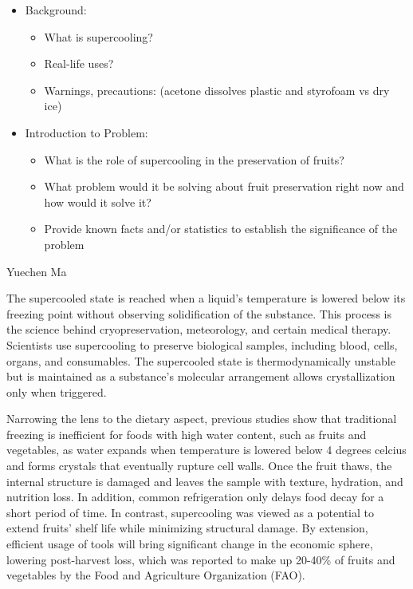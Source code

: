 \begin{itemize}
\item
  Background:

  \begin{itemize}
  \item
    What is supercooling?
  \item
    Real-life uses?
  \item
    Warnings, precautions: (acetone dissolves plastic and styrofoam vs
    dry ice)
  \end{itemize}
\item
  Introduction to Problem:

  \begin{itemize}
  \item
    What is the role of supercooling in the preservation of fruits?
  \item
    What problem would it be solving about fruit preservation right now
    and how would it solve it?
  \item
    Provide known facts and/or statistics to establish the significance
    of the problem
  \end{itemize}
\end{itemize}

Yuechen Ma

The supercooled state is reached when a liquid's temperature is lowered
below its freezing point without observing solidification of the
substance. This process is the science behind cryopreservation,
meteorology, and certain medical therapy. Scientists use supercooling to
preserve biological samples, including blood, cells, organs, and
consumables. The supercooled state is thermodynamically unstable but is
maintained as a substance's molecular arrangement allows crystallization
only when triggered.

Narrowing the lens to the dietary aspect, previous studies show that
traditional freezing is inefficient for foods with high water content,
such as fruits and vegetables, as water expands when temperature is
lowered below 4 degrees celcius and forms crystals that eventually
rupture cell walls. Once the fruit thaws, the internal structure is
damaged and leaves the sample with texture, hydration, and nutrition
loss. In addition, common refrigeration only delays food decay for a
short period of time. In contrast, supercooling was viewed as a
potential to extend fruits' shelf life while minimizing structural
damage. By extension, efficient usage of tools will bring significant
change in the economic sphere, lowering post-harvest loss, which was
reported to make up 20-40\% of fruits and vegetables by the Food and
Agriculture Organization (FAO).

